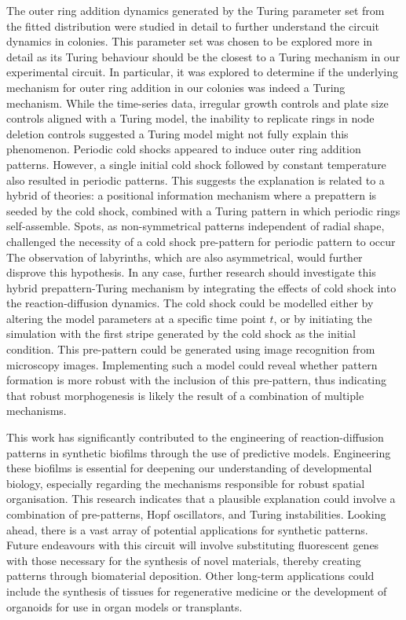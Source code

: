 The outer ring addition dynamics generated by the Turing parameter set from the fitted distribution were studied in detail to further understand the circuit dynamics in colonies.
This parameter set was chosen to be explored more in detail as its Turing behaviour should be the closest to a Turing mechanism in our experimental circuit.
In particular, it was explored to determine if the underlying mechanism for outer ring addition in our colonies was indeed a Turing mechanism.
While the time-series data, irregular growth controls and plate size controls aligned with a Turing model, the inability to replicate rings in node deletion controls suggested a Turing model might not fully explain this phenomenon.
Periodic cold shocks appeared to induce outer ring addition patterns.
However, a single initial cold shock followed by constant temperature also resulted in periodic patterns.
This suggests the explanation is related to a hybrid of theories: a positional information mechanism where a prepattern is seeded by the cold shock, combined with a Turing pattern in which periodic rings self-assemble.
Spots, as non-symmetrical patterns independent of radial shape, challenged the necessity of a cold shock pre-pattern for periodic pattern to occur
The observation of labyrinths, which are also asymmetrical, would further disprove this hypothesis.
In any case, further research should investigate this hybrid prepattern-Turing mechanism by integrating the effects of cold shock into the reaction-diffusion dynamics.
The cold shock could be modelled either by altering the model parameters at a specific time point $t$, or by initiating the simulation with the first stripe generated by the cold shock as the initial condition.
This pre-pattern could be generated using image recognition from microscopy images.
Implementing such a model could reveal whether pattern formation is more robust with the inclusion of this pre-pattern, thus indicating that robust morphogenesis is likely the result of a combination of multiple mechanisms.

This work has significantly contributed to the engineering of reaction-diffusion patterns in synthetic biofilms through the use of predictive models.
Engineering these biofilms is essential for deepening our understanding of developmental biology, especially regarding the mechanisms responsible for robust spatial organisation.
This research indicates that a plausible explanation could involve a combination of pre-patterns, Hopf oscillators, and Turing instabilities.
Looking ahead, there is a vast array of potential applications for synthetic patterns.
Future endeavours with this circuit will involve substituting fluorescent genes with those necessary for the synthesis of novel materials, thereby creating patterns through biomaterial deposition.
Other long-term applications could include the synthesis of tissues for regenerative medicine or the development of organoids for use in organ models or transplants.
